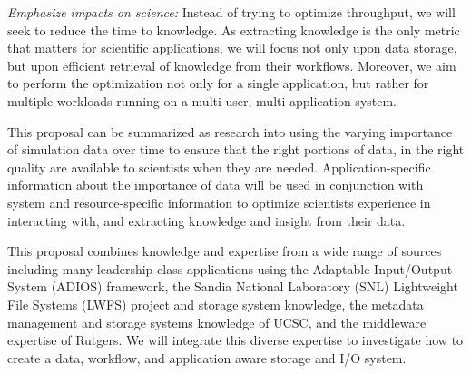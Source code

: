 \begin{tightItemize}
\item
{\em Emphasize impacts on science:}
Instead of trying to optimize throughput, we will seek to reduce the time to knowledge.
As extracting knowledge is the only metric that matters for scientific applications, we will
focus not only upon data storage, but upon efficient  retrieval of knowledge from their 
workflows.
Moreover, we aim to perform the optimization not only for a single
application, but rather for multiple workloads running on a multi-user, multi-application
system.
\end{tightItemize}

This proposal can be summarized as research into using the varying importance of simulation data over time to
ensure that the right portions of data, in the right quality  are available to scientists when they are needed.
Application-specific information about the importance of data will be used in conjunction with system and resource-specific information
to optimize  scientists experience in interacting with, and extracting knowledge and insight from their  data.


This proposal combines knowledge and expertise 
from a wide range of sources including many leadership class applications using the Adaptable Input/Output System (ADIOS) framework,
the Sandia National Laboratory (SNL) Lightweight File Systems (LWFS) project and storage system knowledge, the metadata
management and storage systems knowledge of UCSC, and the middleware expertise
of Rutgers. We will integrate this diverse expertise to investigate how to create
a data, workflow, and application aware storage and I/O system.

